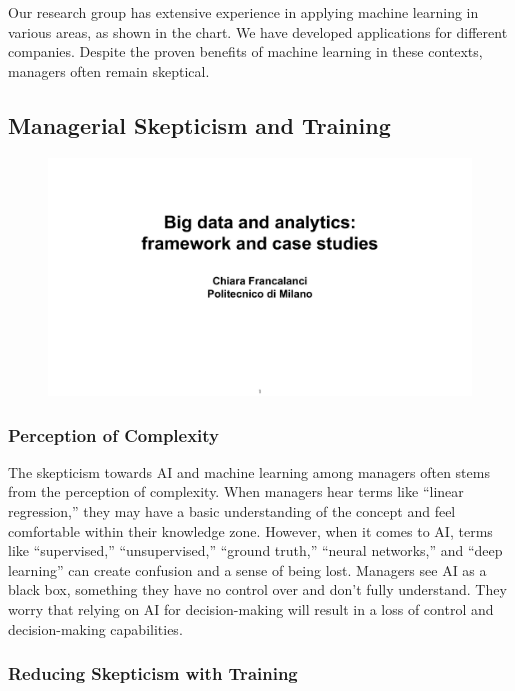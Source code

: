 Our research group has extensive experience in applying machine learning
in various areas, as shown in the chart. We have developed
applications for different companies. Despite the proven benefits of
machine learning in these contexts, managers often remain skeptical.

\subsection{Managerial Skepticism and Training}

\begin{figure}[!h]
    \centering
    \includegraphics[page=25, trim = 0cm 3.5cm 1.5cm 1.2cm, clip, width=\textwidth]{images/06 - BIG_DATA.pdf}
\end{figure}

\subsubsection{Perception of Complexity}

The skepticism towards AI and machine learning among managers often
stems from the perception of complexity. When managers hear terms like
``linear regression,'' they may have a basic understanding of the
concept and feel comfortable within their knowledge zone. However, when
it comes to AI, terms like ``supervised,'' ``unsupervised,'' ``ground
truth,'' ``neural networks,'' and ``deep learning'' can create confusion
and a sense of being lost. Managers see AI as a black box, something
they have no control over and don't fully understand. They worry that
relying on AI for decision-making will result in a loss of control and
decision-making capabilities.

\subsubsection{Reducing Skepticism with Training}

